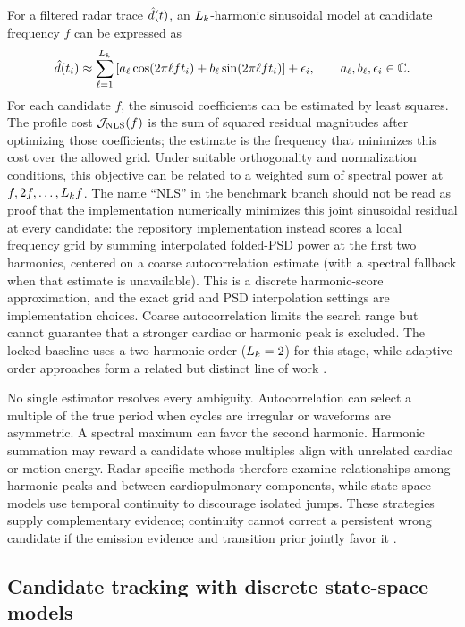 For a filtered radar trace $\hat{d}(t)$, an $L_k$-harmonic sinusoidal model at candidate
frequency $f$ can be expressed as
\begin{equation}
  \hat{d}(t_i) \approx
  \sum_{\ell=1}^{L_k}
  \left[a_\ell\cos(2\pi\ell f t_i)+b_\ell\sin(2\pi\ell f t_i)\right]
  +\epsilon_i, \qquad a_\ell,b_\ell,\epsilon_i\in\mathbb{C}.
  \label{eq:ch2_harmonic_model}
\end{equation}
For each candidate $f$, the sinusoid coefficients can be estimated by least squares. The profile
cost $\mathcal{J}_{\mathrm{NLS}}(f)$ is the sum of squared residual magnitudes after optimizing those coefficients;
the estimate is the frequency that minimizes this cost over the allowed grid. Under suitable
orthogonality and normalization conditions, this objective can be related to a weighted sum of
spectral power at
$f,2f,\ldots,L_k f$. The name ``NLS'' in the benchmark branch should not be read as proof that
the implementation numerically minimizes this joint sinusoidal residual at every candidate: the
repository implementation instead scores a local frequency grid by summing interpolated folded-PSD
power at the first two harmonics, centered on a coarse autocorrelation estimate (with a spectral
fallback when that estimate is unavailable). This is a discrete harmonic-score approximation, and
the exact grid and PSD interpolation settings are implementation choices. Coarse autocorrelation
limits the search range but cannot guarantee that a stronger cardiac or harmonic peak is excluded.
The locked baseline uses a two-harmonic order ($L_k=2$) for this stage, while adaptive-order
approaches form a related but distinct line of work \citep{christensen2008multi,beltrao2023adaptive}.

No single estimator resolves every ambiguity. Autocorrelation can select a multiple of the true
period when cycles are irregular or waveforms are asymmetric. A spectral maximum can favor the
second harmonic. Harmonic summation may reward a candidate whose multiples align with unrelated
cardiac or motion energy. Radar-specific methods therefore examine relationships among harmonic
peaks and between cardiopulmonary components, while state-space models use temporal continuity to
discourage isolated jumps. These strategies supply complementary evidence; continuity cannot
correct a persistent wrong candidate if the emission evidence and transition prior jointly favor
it \citep{naishadham2016estimation,le2020multivariate,beltrao2023adaptive}.

\subsection{Candidate tracking with discrete state-space models}

